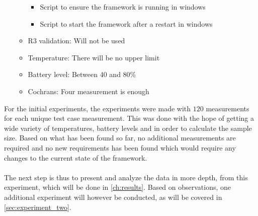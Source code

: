 \begin{itemize}
\begin{itemize}
\begin{itemize}
            \item Script to ensure the framework is running in windows
            \item Script to start the framework after a restart in windows
        \end{itemize}
        \item R3 validation: Will not be used
        \item Temperature: There will be no upper limit
        \item Battery level: Between 40 and 80\%
        \item Cochrans: Four measurement is enough
    \end{itemize}
\end{itemize}

For the initial experiments, the experiments were made with $120$ measurements for each unique test case measurement. This was done with the hope of getting a wide variety of temperatures, battery levels and in order to calculate the sample size. Based on what has been found so far, no additional measurements are required and no new requirements has been found which would require any changes to the current state of the framework.

\paragraph*{}
The next step is thus to present and analyze the data in more depth, from this experiment, which will be done in \cref{ch:results}. Based on observations, one additional experiment will however be conducted, as will be covered in \cref{sec:experiment_two}.
